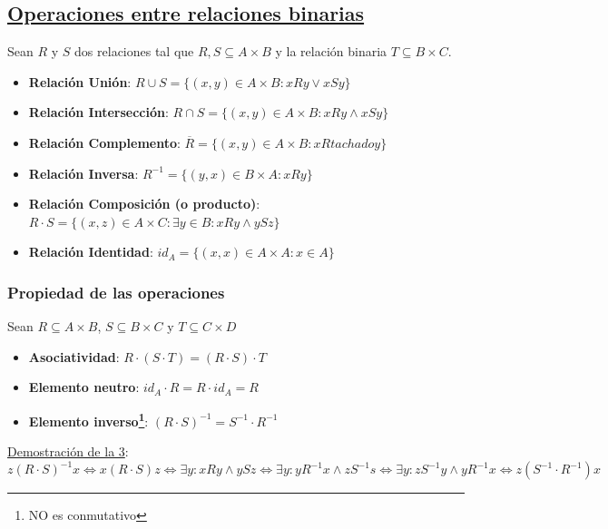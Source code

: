 \documentclass[10pt,a4paper,openright]{book}
\begin{document}
\subsection*{\underline{Operaciones entre relaciones binarias}}
Sean $R$ y $S$ dos relaciones tal que $R,S\subseteq A\times B$ y la relación binaria $T\subseteq B\times C$.
\begin{itemize}
\item \textbf{Relación Unión}: $R\cup S=\{(x,y)\in A\times B: xRy \vee xSy\}$

\item \textbf{Relación Intersección}: $R\cap S=\{(x,y)\in A\times B: xRy \wedge  xSy\}$

\item \textbf{Relación Complemento}: $\overline{R}=\{(x,y)\in A\times B: xRtachadoy\}$

\item \textbf{Relación Inversa}: $R^{-1}=\{(y,x)\in B\times A: xRy\}$

\item \textbf{Relación Composición (o producto)}: $R\cdot S=\{(x,z)\in A\times C:\exists y\in B: xRy\wedge ySz\}$

\item \textbf{Relación Identidad}: $id_A=\{(x,x)\in A\times A: x\in A\}$
\end{itemize}

\subsubsection*{Propiedad de las operaciones}
Sean $R\subseteq A\times B$, $S\subseteq B\times C$ y $T\subseteq C\times D$
\begin{itemize}
\item \textbf{Asociatividad}: $R\cdot (S\cdot T)=(R\cdot S)\cdot T$

\item \textbf{Elemento neutro}: $id_A\cdot R=R\cdot id_A=R$

\item \textbf{Elemento inverso\footnote{NO es conmutativo}}: $(R\cdot S)^{-1}=S^{-1}\cdot R^{-1}$
\end{itemize}

\underline{Demostración de la 3}:
$$z(R\cdot S)^{-1}x\Leftrightarrow x(R\cdot S)z\Leftrightarrow \exists y: xRy\wedge ySz\Leftrightarrow \exists y: yR^{-1}x \wedge zS^{-1}s\Leftrightarrow \exists y: zS^{-1}y\wedge yR^{-1}x\Leftrightarrow z(S^{-1}\cdot R^{-1})x$$
\end{document}
